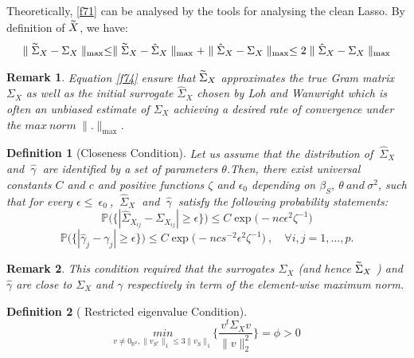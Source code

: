 \documentclass[12pt]{report}
\newtheorem {definition}{Definition}[section] %
\newtheorem{remarque}{Remark}[section]
\begin{document}
Theoretically, \eqref{f71} can be analysed by the tools for analysing the clean Lasso. By definition of $\overset{_{\thicksim}}{X}$, we have:
\begin{equation}
	\parallel\overset{_{\thicksim}}{\Sigma}_{X}-\Sigma_{X} \parallel_{\max}\leq \parallel\overset{_{\thicksim}}{\Sigma}_{X}-\hat{\Sigma}_{X} \parallel_{\max} + \parallel\hat{\Sigma}_{X}-\Sigma_{X} \parallel_{\max} \leq2 \parallel \hat{\Sigma}_{X}-\Sigma_{X} \parallel_{\max}
	\label{f74}
\end{equation}

\begin{remarque}
Equation \eqref{f74} ensure that $\overset{_{\thicksim}}{\Sigma}_{X}$ approximates the true Gram matrix $\Sigma_{X}$ as well as the initial surrogate $\hat{\Sigma}_{X}$ chosen by  \textit{Loh and Wanwright} which is often an unbiased estimate of $\Sigma_{X}$ achieving a desired rate of convergence under the $max\ norm\ \parallel . \parallel_{\max}$.
\end{remarque}
\begin{definition}[Closeness Condition]
	Let us assume that the distribution of $\ \hat{\Sigma}_{X}\ $ and $\ \hat{\gamma}\ $ are identified by a set of parameters $\theta$.Then, there exist universal constants $C$ and $c$ and positive functions $\zeta$ and $\epsilon_{0}$ depending on $\beta_{S},\ \theta\ and\ \sigma^{2} $, such that for every $\epsilon\leq\ \epsilon_{0}\ $, $\ \hat{\Sigma}_{X}\ $ and $\ \hat{\gamma}\ $ satisfy the following probability statements:
	\begin{equation}
		\mathbb{P}\bigg(\bigg\{|\hat{\Sigma}_{X_{ij}}-\Sigma_{X_{ij}}|\geq \epsilon \bigg\}\bigg)\leq C\exp\big(-nc\epsilon^{2}\zeta^{-1}\big)
		\label{f75}
	\end{equation}
\begin{equation}
		\mathbb{P}\bigg(\bigg\{|\hat{\gamma}_{j}-\gamma_{j}|\geq \epsilon \bigg\}\bigg)\leq C\exp\big(-nc s^{-2}\epsilon^{2}\zeta^{-1}\big)\ ,\quad \forall i,j=1,\dots,p.
		\label{f76}
\end{equation}
\end{definition}
\begin{remarque}
	This condition required that the surrogates $\hat{\Sigma}_{X}$ (and hence $\overset{_{\thicksim}}{\Sigma}_{X}$ ) and $\hat{\gamma}$ are close to $\Sigma_{X}$ and $\gamma$ respectively in term of the element-wise maximum norm.
\end{remarque}
\begin{definition}[ Restricted eigenvalue Condition]
	\begin{equation}
		\underset{v\neq0_{\mathbb{R}^{p}},\parallel v_{S^{c}}\parallel_{1}\leq3\parallel v_{S}\parallel_{1}}{min}\bigg\{\frac{v^{t}\Sigma_{X}v}{\parallel v \parallel_{2}^{2}}\bigg\}=\phi>0
		\label{f77}
	\end{equation}
\end{definition}
\end{document}
